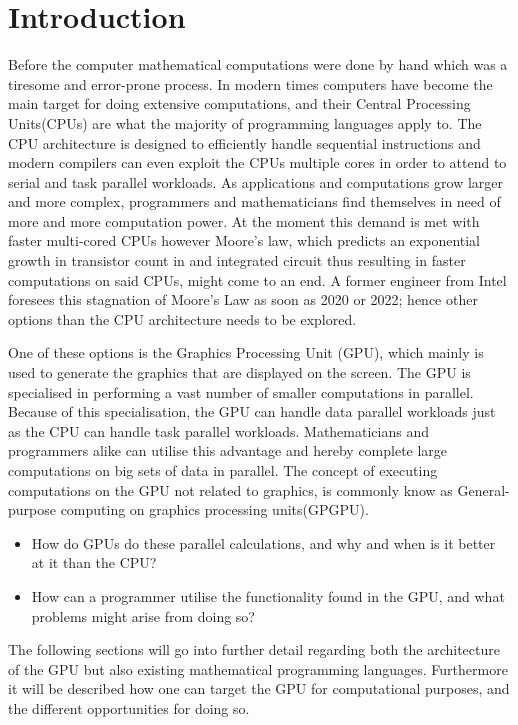 \chapter{Introduction} %
\label{cha:introduction}
Before the computer mathematical computations were done by hand which was a tiresome and error-prone process.
In modern times computers have become the main target for doing extensive computations, and their Central Processing Units(CPUs) are what the majority of programming languages apply to.
The CPU architecture is designed to efficiently handle sequential instructions and modern compilers can even exploit the CPUs multiple cores in order to attend to serial and task parallel workloads.
As applications and computations grow larger and more complex, programmers and mathematicians find themselves in need of more and more computation power.\citep[pp. 4]{OpenCL_AMD}
At the moment this demand is met with faster multi-cored CPUs however Moore's law, which predicts an exponential growth in transistor count in and integrated circuit thus resulting in faster computations on said CPUs, might come to an end.
A former engineer from Intel foresees this stagnation of Moore's Law as soon as 2020 or 2022; hence other options than the CPU architecture needs to be explored. \citep{Moore2013}

One of these options is the Graphics Processing Unit (GPU), which mainly is used to generate the graphics that are displayed on the screen.
The GPU is specialised in performing a vast number of smaller computations in parallel.
Because of this specialisation, the GPU can handle data parallel workloads just as the CPU can handle task parallel workloads.
Mathematicians and programmers alike can utilise this advantage and hereby complete large computations on big sets of data in parallel.
The concept of executing computations on the GPU not related to graphics, is commonly know as General-purpose computing on graphics processing units(GPGPU).

\begin{itemize}
	\item How do GPUs do these parallel calculations, and why and when is it better at it than the CPU?
	\item How can a programmer utilise the functionality found in the GPU, and what problems might arise from doing so? 
\end{itemize}

The following sections will go into further detail regarding both the architecture of the GPU but also existing mathematical programming languages.
Furthermore it will be described how one can target the GPU for computational purposes, and the different opportunities for doing so. 

\newpage

